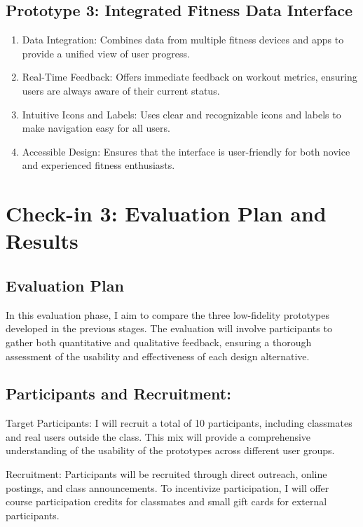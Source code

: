 \documentclass[
	letterpaper, %
]{jdf}
\begin{document}
\subsection{Prototype 3: Integrated Fitness Data Interface}
\begin{enumerate}
        \item Data Integration: Combines data from multiple fitness devices and apps to provide a unified view of user progress.
        \item Real-Time Feedback: Offers immediate feedback on workout metrics, ensuring users are always aware of their current status.
        \item Intuitive Icons and Labels: Uses clear and recognizable icons and labels to make navigation easy for all users.
        \item Accessible Design: Ensures that the interface is user-friendly for both novice and experienced fitness enthusiasts.
\end{enumerate}



\newpage

\section{Check-in 3: Evaluation Plan and Results}
\subsection{Evaluation Plan}
In this evaluation phase, I aim to compare the three low-fidelity prototypes developed in the previous stages. The evaluation will involve participants to gather both quantitative and qualitative feedback, ensuring a thorough assessment of the usability and effectiveness of each design alternative.

\subsection{Participants and Recruitment:}
Target Participants: I will recruit a total of 10 participants, including classmates and real users outside the class. This mix will provide a comprehensive understanding of the usability of the prototypes across different user groups.

Recruitment: Participants will be recruited through direct outreach, online postings, and class announcements. To incentivize participation, I will offer course participation credits for classmates and small gift cards for external participants.
\end{document}
